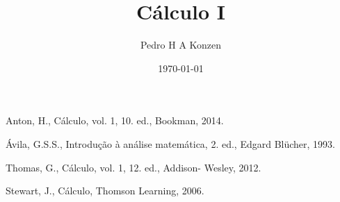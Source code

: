 \documentclass[12pt]{book}
\begin{document}
\frontmatter

\title{Cálculo I}
\author{Pedro H A Konzen}
\date{\today}
\ifishtml
\else
{}
\fi

\maketitle





\tableofcontents
{}

\mainmatter

%
%






\ifisbook

\fi

\ifisbook
\clearpage
{}
{}
\fi

\begin{thebibliography}{99}
  Anton, H., Cálculo, vol. 1, 10. ed., Bookman, 2014.
  
  Ávila, G.S.S., Introdução à análise matemática, 2. ed., Edgard Blücher, 1993.

  Thomas, G., Cálculo, vol. 1, 12. ed., Addison- Wesley, 2012.

  Stewart, J., Cálculo, Thomson Learning, 2006.
\end{thebibliography}
\end{document}
